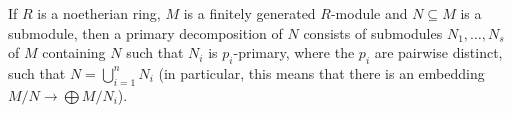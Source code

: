 If $R$ is a noetherian ring, $M$ is a finitely generated $R$-module and $N \subseteq M$
is a submodule, then a primary decomposition of $N$ consists of submodules
$N_1, \ldots, N_s$ of $M$ containing $N$ such that $N_i$ is $p_i$-primary, where
the $p_i$ are pairwise distinct, such that $N = \bigcup_{i = 1}^n N_i$
(in particular, this means that there is an embedding $M/N \to \bigoplus M/N_i$).

